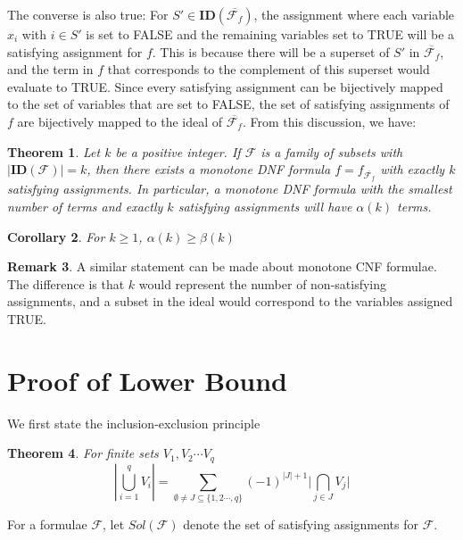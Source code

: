 \documentclass[11pt,a4paper]{article}
\newtheorem{theorem}{Theorem}[section]
\newtheorem{corollary}[theorem]{Corollary}
\theoremstyle{definition}
\newtheorem{remark}[theorem]{Remark}
\begin{document}
The converse is also true: For 
$S' \in \mathbf{ID}(\overline{\mathcal{F}_f})$, the assignment 
where each variable $x_i$ with $i \in S'$ is set to FALSE and 
the remaining variables set to TRUE will be a satisfying 
assignment for $f$. This is because there will be a superset 
of $S'$ in $\overline{\mathcal{F}_f}$, and the term in $f$ 
that corresponds to the complement of this superset would 
evaluate to TRUE. Since every satisfying assignment can be 
bijectively mapped to the set of variables that are set to 
FALSE, the set of satisfying assignments of $f$ are 
bijectively mapped to the ideal of 
$\overline{\mathcal{F}_f}$. From this discussion, we have:

\begin{theorem}\label{thm:ideals_dnf}
	Let $k$ be a positive integer. If $\mathcal{F}$ is a family 
	of subsets with $|\mathbf{ID}(\mathcal{F})| = k$, then there 
	exists a monotone DNF formula 
	$f = f_{\overline{\mathcal{F}_f}}$ with exactly $k$ 
	satisfying assignments. In particular, a monotone DNF formula 
	with the smallest number of terms and exactly $k$ satisfying 
	assignments will have $\alpha(k)$ terms.
\end{theorem}
\begin{corollary}\label{alpha_beta_simp_conn}
For $k\geq 1$, $\alpha(k) \geq \beta(k)$    
\end{corollary}

\begin{remark}
	A similar statement can be made about monotone CNF formulae. 
	The difference is that $k$ would represent the number of 
	non-satisfying assignments, and a subset in the ideal would 
	correspond to the variables assigned TRUE.
\end{remark}
%

%
%



\section{Proof of Lower Bound}\label{sec:lower}
We first state the inclusion-exclusion principle
\begin{theorem}\label{inclexclthmpwset}
	For finite sets $V_1,V_2\cdots V_q$
	$$
	|\bigcup_{i=1}^{q} V_i | = \sum_{\emptyset \neq J \subseteq \{1,2\cdots,q\}}(-1)^{|J|+1}  \Biggl|\bigcap_{j \in J} V_j\Biggr|
	$$    
\end{theorem}
For a formulae $\mathcal{F}$, let $Sol(\mathcal{F})$ denote the set of satisfying assignments for $\mathcal{F}$.
\end{document}
